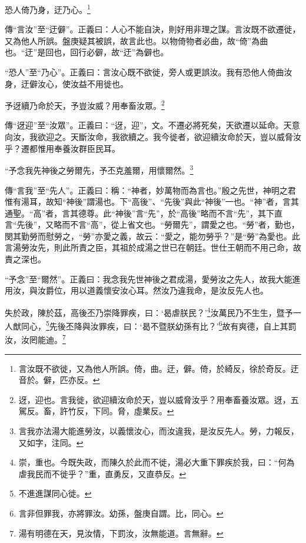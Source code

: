 恐人倚乃身，迂乃心。\footnote{言汝既不欲徙，又為他人所誤。倚，曲。迂，僻。倚，於綺反，徐於奇反。迂音於。僻，匹亦反。}

{\noindent\zhuan{}\fzbyks 傳“言汝”至“迂僻”。正義曰：人心不能自決，則好用非理之謀。言汝既不欲遷徙，又為他人所誤。盤庚疑其被誤，故言此也。以物倚物者必曲，故“倚”為曲也。“迂”是回也，回行必僻，故“迂”為僻也。 \par}

{\noindent\shu{}\fzkt “恐人”至“乃心”。正義曰：言汝心既不欲徙，旁人或更誤汝。我有恐他人倚曲汝身，迂僻汝心，使汝益不用徙也。 \par}

予迓續乃命於天，予豈汝威？用奉畜汝眾。\footnote{迓，迎也。言我徙，欲迎續汝命於天，豈以威脅汝乎？用奉畜養汝眾。迓，五駕反。畜，許竹反，下同。脅，虛業反。}

{\noindent\zhuan{}\fzbyks 傳“迓迎”至“汝眾”。正義曰：“迓，迎”，文。不遷必將死矣，天欲遷以延命。天意向汝，我欲迎之。天斷汝命，我欲續之。我今徙者，欲迎續汝命於天，豈以威脅汝乎？遷都惟用奉養汝群臣民耳。 \par}

“予念我先神後之勞爾先，予丕克羞爾，用懷爾然。\footnote{言我亦法湯大能進勞汝，以義懷汝心，而汝違我，是汝反先人。勞，力報反，又如字，注同。}

{\noindent\zhuan{}\fzbyks 傳“言我”至“先人”。正義曰：稱：“神者，妙萬物而為言也。”殷之先世，神明之君惟有湯耳，故知“神後”謂湯也。下“高後”、“先後”與此“神後”一也。“神”者，言其通聖。“高”者，言其德尊。此“神後”言“先”，於“高後”略而不言“先”，其下直言“先後”，又略而不言“高”，從上省文也。“勞爾先”，謂愛之也。“勞”者，勤也，閔其勤勞而慰勞之，“勞”亦愛之義，故云：“愛之，能勿勞乎？”是“勞”為愛也。此言湯勞汝先，則此所責之臣，其祖於成湯之世已在朝廷。世仕王朝而不用己命，故責之深也。 \par}

{\noindent\shu{}\fzkt “予念”至“爾然”。正義曰：我念我先世神後之君成湯，愛勞汝之先人，故我大能進用汝，與汝爵位，用以道義懷安汝心耳。然汝乃違我命，是汝反先人也。 \par}

失於政，陳於茲，高後丕乃崇降罪疾，曰：‘曷虐朕民？’\footnote{崇，重也。今既失政，而陳久於此而不徙，湯必大重下罪疾於我，曰：“何為虐我民而不徙乎？”重，直勇反，又直恭反。}汝萬民乃不生生，暨予一人猷同心，\footnote{不進進謀同心徙。}先後丕降與汝罪疾，曰：‘曷不暨朕幼孫有比？’\footnote{言非但罪我，亦將罪汝。幼孫，盤庚自謂。比，同心。}故有爽德，自上其罰汝，汝罔能迪。\footnote{湯有明德在天，見汝情，下罰汝，汝無能道。言無辭。}

